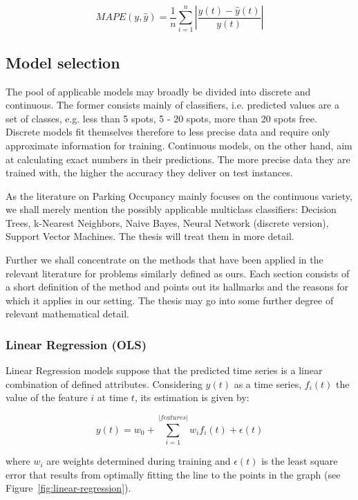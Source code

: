 \documentclass{article}
\begin{document}
$$MAPE(y, \hat{y}) = \frac{1}{n}\sum_{i=1}^{n}|\frac{y(t) - \hat{y}(t)}{y(t)}|$$

\subsection{Model selection}
The pool of applicable models may broadly be divided into discrete and continuous. The former consists mainly of classifiers, i.e. predicted values are a set of classes, e.g. less than 5 spots, 5 - 20 spots, more than 20 spots free. Discrete models fit themselves therefore to less precise data and require only approximate information for training. Continuous models, on the other hand, aim at calculating exact numbers in their predictions. The more precise data they are trained with, the higher the accuracy they deliver on test instances. 

\vspace{2mm}
As the literature on Parking Occupancy mainly focuses on the continuous variety, we shall merely mention the possibly applicable multiclass classifiers: Decision Trees, k-Nearest Neighbors, Naive Bayes, Neural Network (discrete version), Support Vector Machines. The thesis will treat them in more detail.

\vspace{2mm}
Further we shall concentrate on the methods that have been applied in the relevant literature for problems similarly defined as ours. Each section consists of a short definition of the method and points out its hallmarks and the reasons for which it applies in our setting. The thesis may go into some further degree of relevant mathematical detail.

\subsubsection{Linear Regression (OLS)}
Linear Regression models suppose that the predicted time series is a linear combination of defined attributes. Considering $y(t)$ as a time series, $f_i(t)$ the value of the feature $i$ at time $t$, its estimation is given by:

$$y(t) = w_0 + \sum_{i=1}^{|features|}w_i f_i(t) + \epsilon(t)$$

where $w_i$ are weights determined during training and $\epsilon(t)$ is the least square error that results from optimally fitting the line to the points in the graph (see Figure~\ref{fig:linear-regression}).
\end{document}
